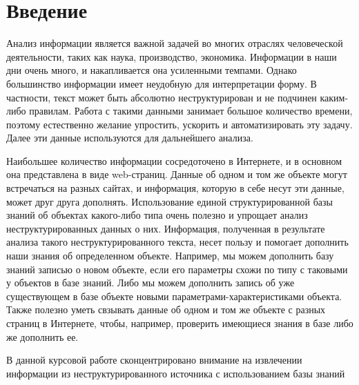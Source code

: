 \chapter*{Введение}

Анализ информации является важной задачей во многих отраслях человеческой деятельности, таких как наука, производство, экономика. Информации в наши дни очень много, и накапливается она усиленными темпами. Однако большинство информации имеет неудобную для интерпретации форму. В частности, текст может быть абсолютно неструктурирован и не подчинен каким-либо правилам. Работа с такими данными занимает большое количество времени, поэтому естественно желание упростить, ускорить и автоматизировать эту задачу. Далее эти данные используются для дальнейшего анализа.

Наибольшее количество информации сосредоточено в Интернете, и в основном она представлена в виде web-страниц. Данные об одном и том же объекте могут встречаться на разных сайтах, и информация, которую в себе несут эти данные, может друг друга дополнять. Использование единой структурированной базы знаний об объектах какого-либо типа очень полезно и упрощает анализ неструктурированных данных о них. Информация, полученная в результате анализа такого неструктурированного текста, несет пользу и помогает дополнить наши знания об определенном объекте. Например, мы можем дополнить базу знаний записью о новом объекте, если его параметры схожи по типу с таковыми у объектов в базе знаний. Либо мы можем дополнить запись об уже существующем в базе объекте новыми параметрами-характеристиками объекта. Также полезно уметь свзывать данные об одном и том же объекте с разных страниц в Интернете, чтобы, например, проверить имеющиеся знания в базе либо же дополнить ее.

В данной курсовой работе сконцентрировано внимание на извлечении информации из неструктурированного источника с использованием базы знаний